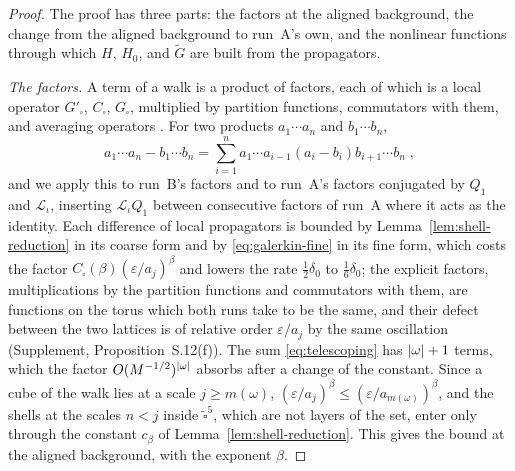 \documentclass[11pt]{preprint}
\DeclarePairedDelimiter{\abs}{\lvert}{\rvert}
\numberwithin{equation}{section}
\theoremstyle{definition}
\theoremstyle{remark}
\theoremstyle{plain}
\begin{document}
\begin{proof}
The proof has three parts: the factors at the aligned background, the change from the aligned background to run~A's own, and the nonlinear functions through which $H$, $H_0$, and $\tilde G$ are built from the propagators.

\emph{The factors.} A term of a walk is a product of factors, each of which is a local operator $G'_\square$, $C_\square$, $G_\square$, multiplied by partition functions, commutators with them, and averaging operators \cite[pp.~409--416]{BalabanPBG}. For two products $a_1\cdots a_n$ and $b_1\cdots b_n$,
\begin{equation}\label{eq:telescoping}
    a_1\cdots a_n - b_1\cdots b_n = \sum_{i=1}^{n}a_1\cdots a_{i-1}(a_i - b_i)b_{i+1}\cdots b_n\;,
\end{equation}
and we apply this to run~B's factors and to run~A's factors conjugated by $Q_1$ and $\mathcal L_\iota$, inserting $\mathcal L_\iota Q_1$ between consecutive factors of run~A where it acts as the identity. Each difference of local propagators is bounded by Lemma~\ref{lem:shell-reduction} in its coarse form and by \eqref{eq:galerkin-fine} in its fine form, which costs the factor $C_\square(\beta)(\varepsilon/a_j)^\beta$ and lowers the rate $\frac12\delta_0$ to $\frac16\delta_0$; the explicit factors, multiplications by the partition functions and commutators with them, are functions on the torus which both runs take to be the same, and their defect between the two lattices is of relative order $\varepsilon/a_j$ by the same oscillation (Supplement, Proposition~S.12(f)). The sum \eqref{eq:telescoping} has $\abs{\omega} + 1$ terms, which the factor $O(M^{-1/2})^{\abs{\omega}}$ absorbs after a change of the constant. Since a cube of the walk lies at a scale $j \geq m(\omega)$, $(\varepsilon/a_j)^\beta \leq (\varepsilon/a_{m(\omega)})^\beta$, and the shells at the scales $n < j$ inside $\tilde\square^5$, which are not layers of the set, enter only through the constant $c_\beta$ of Lemma~\ref{lem:shell-reduction}. This gives the bound at the aligned background, with the exponent $\beta$.


\end{proof}
\end{document}

